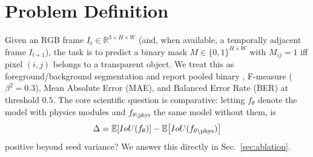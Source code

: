 \section{Problem Definition}
Given an RGB frame $I_t\in\mathbb{R}^{3\times H\times W}$ (and, when available, a
temporally adjacent frame $I_{t+1}$), the task is to predict a binary mask
$M\in\{0,1\}^{H\times W}$ with $M_{ij}=1$ iff pixel $(i,j)$ belongs to a
transparent object. We treat this as foreground/background segmentation and
report pooled binary \iou, F-measure ($\beta^2=0.3$), Mean Absolute Error
(MAE), and Balanced Error Rate (BER) at threshold $0.5$. The core scientific
question is comparative: letting $f_\theta$ denote the model with physics
modules and $f_{\theta\setminus\mathrm{phys}}$ the same model without them, is
\begin{equation}
\Delta = \mathbb{E}\!\left[IoU(f_\theta)\right]-\mathbb{E}\!\left[IoU(f_{\theta\setminus\mathrm{phys}})\right]
\end{equation}
positive beyond seed variance? We answer this directly in Sec.~\ref{sec:ablation}.

